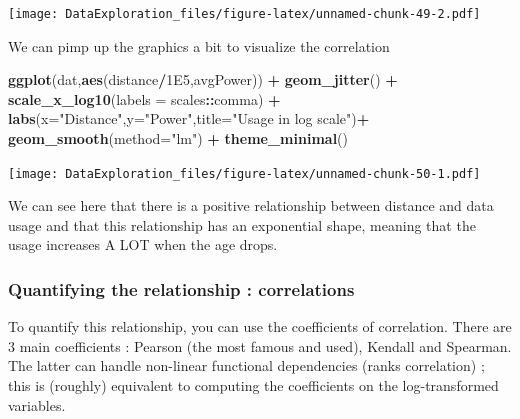 \documentclass[
]{book}
\newenvironment{Shaded}{\begin{snugshade}}{\end{snugshade}}
\newcommand{\CommentTok}[1]{\textcolor[rgb]{0.56,0.35,0.01}{\textit{#1}}}
\newcommand{\DataTypeTok}[1]{\textcolor[rgb]{0.13,0.29,0.53}{#1}}
\newcommand{\FloatTok}[1]{\textcolor[rgb]{0.00,0.00,0.81}{#1}}
\newcommand{\KeywordTok}[1]{\textcolor[rgb]{0.13,0.29,0.53}{\textbf{#1}}}
\newcommand{\NormalTok}[1]{#1}
\newcommand{\OperatorTok}[1]{\textcolor[rgb]{0.81,0.36,0.00}{\textbf{#1}}}
\newcommand{\StringTok}[1]{\textcolor[rgb]{0.31,0.60,0.02}{#1}}
\begin{document}
\texttt{[image: DataExploration\_files/figure-latex/unnamed-chunk-49-2.pdf]}

We can pimp up the graphics a bit to visualize the correlation

\begin{Shaded}
\begin{Highlighting}[]
\KeywordTok{ggplot}\NormalTok{(dat,}\KeywordTok{aes}\NormalTok{(distance}\OperatorTok{/}\FloatTok{1E5}\NormalTok{,avgPower)) }\OperatorTok{+}\StringTok{ }\KeywordTok{geom_jitter}\NormalTok{() }\OperatorTok{+}\StringTok{ }\KeywordTok{scale_x_log10}\NormalTok{(}\DataTypeTok{labels =}\NormalTok{ scales}\OperatorTok{::}\NormalTok{comma) }\OperatorTok{+}\StringTok{ }
\StringTok{  }\KeywordTok{labs}\NormalTok{(}\DataTypeTok{x=}\StringTok{"Distance"}\NormalTok{,}\DataTypeTok{y=}\StringTok{"Power"}\NormalTok{,}\DataTypeTok{title=}\StringTok{"Usage in log scale"}\NormalTok{)}\OperatorTok{+}\StringTok{  }\KeywordTok{geom_smooth}\NormalTok{(}\DataTypeTok{method=}\StringTok{"lm"}\NormalTok{) }\OperatorTok{+}\StringTok{ }\KeywordTok{theme_minimal}\NormalTok{()}
\end{Highlighting}
\end{Shaded}

\texttt{[image: DataExploration\_files/figure-latex/unnamed-chunk-50-1.pdf]}

We can see here that there is a positive relationship between distance and data usage and that this relationship has an exponential shape, meaning that the usage increases A LOT when the age drops.

\hypertarget{quantifying-the-relationship-correlations}{%
\subsubsection{\texorpdfstring{Quantifying the relationship : correlation\textbf{s}}{Quantifying the relationship : correlations}}\label{quantifying-the-relationship-correlations}}

To quantify this relationship, you can use the coefficients of correlation. There are 3 main coefficients : Pearson (the most famous and used), Kendall and Spearman. The latter can handle non-linear functional dependencies (ranks correlation) ; this is (roughly) equivalent to computing the coefficients on the log-transformed variables.

\begin{Shaded}
\end{Shaded}
\end{document}
